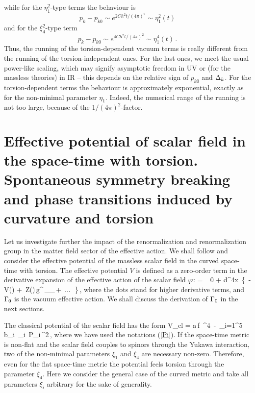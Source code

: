 while for the $\eta_1^2$-type terms the behaviour is
$$
p_k - p_{k0} \sim e^{2Ch^2t/(4\pi)^2} \sim \eta_1^2(t)  
$$
and for the $\xi_4^2$-type term 
$$
p_k - p_{k0} \sim e^{4Ch^2t/(4\pi)^2} \sim \eta_1^4(t)\,.  
$$
Thus, the running of the torsion-dependent vacuum terms
is really different from the running of the torsion-independent 
ones. For the last ones, we meet the usual power-like scaling, 
which may signify asymptotic freedom in UV or (for the 
massless theories) in IR -- this depends on the relative sign 
of $p_{k0}$ and $\Delta_k$. For the torsion-dependent terms
the behaviour is approximately exponential, exactly as
for the non-minimal parameter $\eta_1$. Indeed, the numerical 
range of the running is not too large, because of the 
$1/(4\pi)^2$-factor.

\section{Effective potential of scalar field in the space-time 
with torsion. Spontaneous symmetry breaking and phase transitions 
induced by curvature and torsion}

Let us investigate further the impact of the renormalization and 
renormalization group in the matter field sector of the effective 
action. We shall follow \cite{bosh-pot} and consider the 
effective potential of the massless 
scalar field in the curved space-time with torsion. The effective 
potential $V$ is defined as a zero-order term in the derivative 
expansion of the effective action of the scalar field $\varphi$: 
\beq
\Ga [ \ph ] = \Ga_0 + \int d^4x\,
\left\{\, - V(\ph) 
+ \,Z(\ph)\,g^{\mu\nu}\,\pa_\mu\ph\pa_\nu\ph \,+ \,...\,
\,\right\}\,,
\label{efpo}
\eeq
where the dots stand for higher derivative terms, and $\Gamma_0$ 
is the vacuum effective action. We shall discuss the derivation 
of $\Gamma_0$ in the next sections. 

The classical potential of the scalar field has the form
\beq
V_{cl} = a\,f\, \ph^4\, -\, 
\sum_{i=1}^{5}\,b_i\, \xi_i\, P_i\,\ph^2\,,
\label{clpo}
\eeq
where we have used the notations (\ref{Pi}). If the space-time
metric  is non-flat and the scalar field
couples to spinors through the Yukawa interaction, two of the 
non-minimal parameters $\xi_1$ and $\xi_4$ are necessary 
non-zero. Therefore, even for the flat space-time metric the
potential feels torsion through the parameter $\xi_4$.
Here we consider the general case of the curved metric and 
take all parameters $\xi_i$ arbitrary for the sake of 
generality. 

